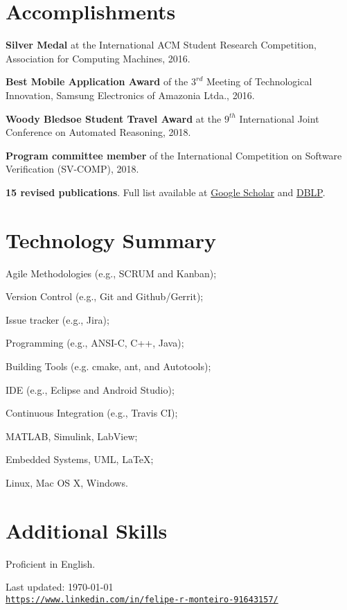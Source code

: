 \documentclass[letterpaper]{article}
\def\footerlink{https://www.linkedin.com/in/felipe-r-monteiro-91643157/}
\renewenvironment{itemize}{
  \begin{list}{}{
    \setlength{\leftmargin}{1.5em}
  }
}{
  \end{list}
}
\begin{document}
\section*{Accomplishments}
\begin{itemize}
  \item {\bf Silver Medal} at the International ACM Student Research Competition, Association for Computing Machines, 2016.

  \item {\bf Best Mobile Application Award} of the $3^{rd}$ Meeting of Technological Innovation, Samsung Electronics of Amazonia Ltda., 2016.
  
  \item {\bf Woody Bledsoe Student Travel Award} at the $9^{th}$ International Joint Conference on Automated Reasoning, 2018.
  
  \item {\bf Program committee member} of the International Competition on Software Verification (SV-COMP), 2018.

  \item {\bf 15 revised publications}. Full list available at \href{https://scholar.google.com/citations?hl=en&user=6bNQcz0AAAAJ}{Google Scholar} and \href{https://dblp.uni-trier.de/pers/hd/m/Monteiro:Felipe_R=}{DBLP}.
\end{itemize}

\section*{Technology Summary}
   \begin{itemize}
   \item{Agile Methodologies (e.g., SCRUM and Kanban);}
   \item{Version Control (e.g., Git and Github/Gerrit);}
   \item{Issue tracker (e.g., Jira);}
   \item{Programming (e.g., ANSI-C, C++, Java);}
   \item{Building Tools (e.g. cmake, ant, and Autotools);}
   \item{IDE (e.g., Eclipse and Android Studio);}
   \item{Continuous Integration (e.g., Travis CI);}
   \item{MATLAB, Simulink, LabView;}
   \item{Embedded Systems, UML, \LaTeX;}
   \item{Linux, Mac OS X, Windows.}
   \end{itemize}
   
\section*{Additional Skills}
\begin{itemize}
  \item Proficient in English.
\end{itemize}

\bigskip

\begin{center}
  \begin{footnotesize}
    Last updated: \today \\
    \href{\footerlink}{\texttt{\footerlink}}
  \end{footnotesize}
\end{center}
\end{document}

